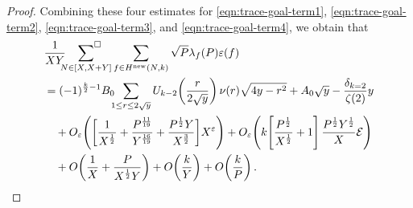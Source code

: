 \documentclass[12pt,letterpaper,reqno]{amsart}
\theoremstyle{plain}
\theoremstyle{definition}
\numberwithin{equation}{section}
\numberwithin{figure}{section}
\numberwithin{table}{section}
\newcommand{\lrp}[1]{\!\left(#1\right)}
\newcommand{\lrb}[1]{\!\left[#1\right]}
\newcommand{\EE}{\mathcal{E}}
\newcommand{\new}{{\rm new}}
\begin{document}
\begin{proof}
Combining these four estimates for \eqref{eqn:trace-goal-term1}, \eqref{eqn:trace-goal-term2}, \eqref{eqn:trace-goal-term3}, and \eqref{eqn:trace-goal-term4}, we obtain that
\begin{align}
    & \frac{1}{XY} \sideset{}{^\square}\sum_{N \in [X, X+Y]}\sum_{f \in H^\new(N,k)} \sqrt{P}\lambda_f(P)\varepsilon(f) \\
    & = (-1)^{\frac{k}{2}-1} B_0\!\!\!\sum_{1 \le r \le 2\sqrt{y}}U_{k-2}\lrp{\frac{r}{2\sqrt{y}}} \nu(r)\sqrt{4y-r^2} + A_0\sqrt{y} - \frac{\delta_{k=2}}{\zeta(2)} y \\
    &\quad + O_\varepsilon\lrp{\bigg[\frac{1}{X^\frac{1}{2}} + \frac{P^{\frac{11}{19}}}{Y^{\frac{16}{19}}} + \frac{P^\frac{1}{2}Y}{X^{\frac{3}{2}}}\bigg]X^\varepsilon}  
    + O_\varepsilon\lrp{ k
        \lrb{
            \frac{P^\frac{1}{2}}{X^\frac{1}{2}}
            + 1
        }
        \frac{P^\frac{1}{2} Y^\frac{1}{2}}{X}
        \EE
       } \\
    &\quad + O\lrp{\frac{1}{X} + \frac{P}{X^{\frac{1}{2}}Y}} +  O\lrp{\frac{k}{Y}}+O\lrp{\frac{k}{P}}.
    \label{eqn:final-big-O-error-terms-PXY}
\end{align}


\end{proof}
\end{document}
